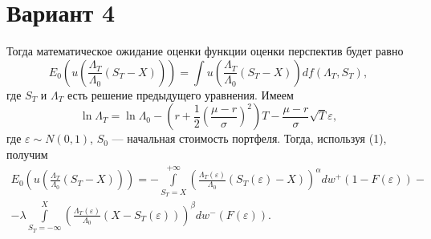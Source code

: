 \documentclass{article}
\begin{document}
\section*{Вариант 4}
Тогда математическое ожидание оценки функции оценки перспектив будет равно
\[
E_0 \left( u \left( \frac{\Lambda_T}{\Lambda_0} (S_T - X) \right) \right) = \int u \left( \frac{\Lambda_T}{\Lambda_0} (S_T - X) \right) df (\Lambda_T, S_T) ,
\]
где $S_T$ и $\Lambda_T$ есть решение предыдущего уравнения. Имеем
\begin{equation}
\ln\Lambda_T = \ln\Lambda_0 - \left(r + \frac{1}{2}\left( \frac{\mu - r}{\sigma}\right)^2 \right) T - \frac{\mu - r}{\sigma} \sqrt{T} \varepsilon,
\end{equation}
где  $\varepsilon \sim N(0,1)$, $S_0$ ---  начальная стоимость портфеля. Тогда, используя (1), получим
\begin{multline}
E_0 \left( u \left( \frac{\Lambda_T}{\Lambda_0} (S_T - X) \right) \right) = -\int\limits_{S_T = X}^{+\infty} \left( \frac{\Lambda_T(\varepsilon)}{\Lambda_0}
(S_T(\varepsilon) - X) \right)^\alpha dw^+(1 - F(\varepsilon)) - \\ - \lambda \int\limits_{S_T = -\infty}^X \left( \frac{\Lambda_T(\varepsilon)}{\Lambda_0}
(X - S_T(\varepsilon)) \right)^\beta dw^-(F(\varepsilon)).
\end{multline}
\end{document}
